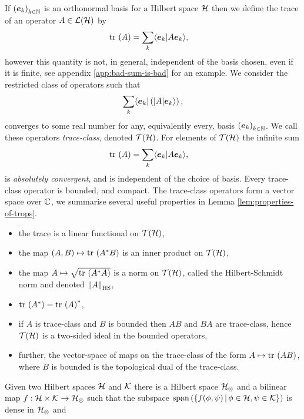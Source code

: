 If $\seq{\boe_k}[k\in\N]$ is an orthonormal basis for a Hilbert space $\mathcal{H}$ then we define the trace of an operator $A\in\bops[\hcal]$ by
\begin{align}
  \tr{A} &= \sum_k \braket{\boe_k}{A\boe_k},
\end{align}
however this quantity is not, in general, independent of the basis chosen, even if it is finite, see appendix \ref{app:bad-sum-is-bad} for an example. We consider the restricted class of operators such that
\begin{align}
  \sum_k \langle \bm{e}_k|\left({\left\lvert{A}\right\rvert}\bm{e}_k\rangle\right),
\end{align}
converges to some real number for any, equivalently every, basis $\seq{\boe_k}[k\in\N]$. We call these operators \emph{trace-class}, denoted $\trops[\hcal]$. For elements of $\trops[\hcal]$ the infinite sum
\begin{align}
  \tr{A} &= \sum_k \braket{\boe_k}{A\boe_k},
\end{align}
is \emph{absolutely convergent}, and is independent of the choice of basis. Every trace-class operator is bounded, and compact. The trace-class operators form a vector space over $\mathbb{C}$, we summarise several useful properties in Lemma \ref{lem:properties-of-trops}.
\begin{lem}
\label{lem:properties-of-trops}\leavevmode
\begin{itemize}
  \item the trace is a linear functional on $\trops[\hcal]$,
  \item the map $(A, B)\mapsto \tr{A^*B}$ is an inner product on $\trops[\hcal]$,
  \item the map $A\mapsto \sqrt{\tr{A^*A}}$ is a norm on $\trops[\hcal]$, called the Hilbert-Schmidt norm and denoted ${\left\lVert{A}\right\rVert}_{\text{HS}}$,
  \item $\tr{A^*} = \tr{A}^*$,
  \item if $A$ is trace-class and $B$ is bounded then $AB$ and $BA$ are trace-class, hence $\trops[\hcal]$ is a two-sided ideal in the bounded operators,
  \item further, the vector-space of maps on the trace-class of the form $A\mapsto\tr{AB}$, where $B$ is bounded is the topological dual of the trace-class.
\end{itemize}
\end{lem}
Given two Hilbert spaces $\mathcal{H}$ and $\mathcal{K}$ there is a Hilbert space $\mathcal{H}_\otimes$ and a bilinear map $f:\mathcal{H}\times\mathcal{K}\to\mathcal{H}_\otimes$ such that the subspace $\operatorname{span}\left(\left\{f(\phi,\psi)\,\middle|\,\phi\in\mathcal{H}, \psi\in\mathcal{K}\right\}\right)$ is dense in $\mathcal{H}_\otimes$ and 
